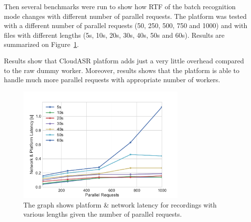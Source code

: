 Then several benchmarks were run to show how RTF of the batch recognition mode changes with different number of parallel requests.
The platform was tested with a different number of parallel requests (50, 250, 500, 750 and 1000)
  and with files with different lengths (5s, 10s, 20s, 30s, 40s, 50s and 60s).
Results are summarized on Figure~\ref{fig:parallel-benchmark}.

Results show that CloudASR platform adds just a very little overhead compared to the raw dummy worker.
Moreover, results shows that the platform is able to handle much more parallel requests with appropriate number of workers.


\begin{figure}[h]
  \centering
  \includegraphics[width=0.75\textwidth]{./img/parallel.pdf}

  \caption{
    The graph shows platform \& network latency for recordings with various lengths
      given the number of parallel requests.
  }
  \label{fig:parallel-benchmark}
\end{figure}
